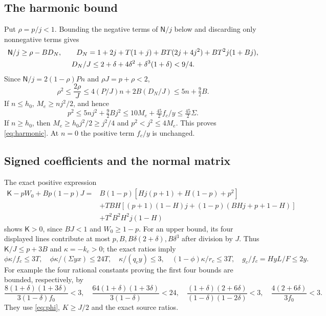 \subsection*{The harmonic bound}
Put $\rho=p/j<1$. Bounding the negative terms of $\mathsf N/j$ below
and discarding only nonnegative terms gives
\begin{gather}
 \mathsf N/j\geq\rho-BD_N,\qquad
 D_N=1+2j+T(1+j)+BT(2j+4j^2)+BT^2j(1+Bj),\notag\\
 D_N/J\leq2+\delta+4\delta^2+\delta^3(1+\delta)<9/4.
 \label{eq:Nlower}
\end{gather}
Since $\mathsf N/j=2(1-\rho)Pn$ and $\rho J=p+\rho<2$,
\[
 \rho^2\leq\frac{2\rho}{J}
 \leq4(P/J)n+2B(D_N/J)
 \leq5n+\tfrac92B .
\]
If $n\leq h_0$, $M_e\geq nj^2/2$, and hence
\[
 p^2\leq5nj^2+\tfrac92Bj^2
 \leq10M_e+\tfrac{45}{2}f_c/y
 \leq\tfrac{45}{2}\Sigma .
\]
If $n\geq h_0$, then $M_e\geq h_0j^2/2\geq j^2/4$ and $p^2<j^2\leq4M_e$.
This proves \eqref{eq:harmonic}. At $n=0$ the positive term $f_c/y$
is unchanged.

\subsection*{Signed coefficients and the normal matrix}
The exact positive expression
\begin{align*}
 \mathsf K-pW_0+Bp(1-p)J
 ={}&B(1-p)[Hj(p+1)+H(1-p)+p^2]\\
 &+TBH[(p+1)(1-H)j+(1-p)(BHj+p+1-H)]\\
 &+T^2B^2H^2j(1-H)
\end{align*}
shows $\mathsf K>0$, since $BJ<1$ and $W_0\geq1-p$.
For an upper bound, its four displayed lines contribute at most
$p,B,B\delta(2+\delta),B\delta^3$ after division by $J$.
Thus $\mathsf K/J\leq p+3B$ and $\kappa=-k_c>0$; the exact ratios imply
\begin{equation}
 \phi\kappa/f_c\leq3T,\quad
 \phi\kappa/(\Sigma yx)\leq24T,\quad
 \kappa/(q_cy)\leq3,\quad
 (1-\phi)\kappa/r_c\leq3T,\quad
 g_c/f_c=HyL/F\leq2y.
 \label{eq:kappabounds}
\end{equation}
For example the four rational constants proving the first four bounds are
bounded, respectively, by
\[
 \frac{8(1+\delta)(1+3\delta)}{3(1-\delta)f_0}<3,\quad
 \frac{64(1+\delta)(1+3\delta)}{3(1-\delta)}<24,\quad
 \frac{(1+\delta)(2+6\delta)}{(1-\delta)(1-2\delta)}<3,\quad
 \frac{4(2+6\delta)}{3f_0}<3.
\]
They use \eqref{eq:phi}, $K\geq J/2$ and the exact source ratios.

